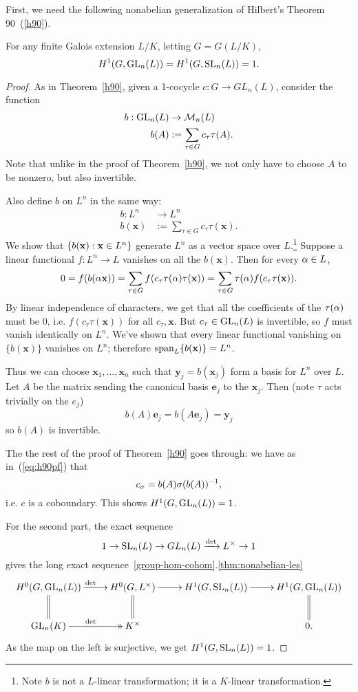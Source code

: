 First, we need the following nonabelian generalization of Hilbert's Theorem 90~(\ref{h90}).
\begin{thm}
For any finite Galois extension $L/K$, letting $G=G(L/K)$,
\[
H^1(G,\operatorname{GL}_n(L))=H^1(G,\operatorname{SL}_n(L))=1.
\]
\end{thm}
\begin{proof}
As in Theorem~\ref{h90}, given a 1-cocycle $c:G\to GL_n(L)$, consider the function
\begin{align*}
b:\operatorname{GL}_n(L)&\to \mathcal{M}_n(L)\\
b(A)&:=\sum_{\tau \in G}c_{\tau}\tau(A).
\end{align*}
Note that unlike in the proof of Theorem~\ref{h90}, we not only have to choose $A$  to be nonzero, but also invertible.

Also define $b$ on $L^n$ in the same way:
\begin{align*}
b:L^n&\to L^n\\
b(\mathbf x)&:=\sum_{\tau \in G}c_{\tau}\tau(\mathbf x).
\end{align*}
We show that $\left\{{b(\mathbf x)}:{\mathbf x\in L^n}\right\}$ generate $L^n$ as a vector space over $L$.\footnote{Note $b$ is not a $L$-linear transformation; it is a $K$-linear transformation.} Suppose a linear functional $f:L^n\to L$ vanishes on all the $b(\mathbf x)$. Then for every $\alpha\in L$,
\[
0=f(b(\alpha \mathbf x))=\sum_{\tau\in G}f(c_{\tau}\tau(\alpha)\tau(\mathbf x))
=\sum_{\tau\in G} \tau(\alpha)f(c_{\tau}\tau(\mathbf x)).
\]
By linear independence of characters, we get that all the coefficients of the $\tau(\alpha)$ must be 0, i.e. $f(c_{\tau}\tau(\mathbf x))$ for all $c_{\tau}, \mathbf x$. But $c_{\tau}\in \operatorname{GL}_n(L)$ is invertible, so $f$ must vanish identically on $L^n$. We've shown that every linear functional vanishing on $\{b(\mathbf x)\}$ vanishes on $L^n$; therefore $\operatorname{span}_L\{b(\mathbf x)\}=L^n$.

Thus we can choose $\mathbf x_1,\ldots, \mathbf x_n$ such that $\mathbf y_j=b(\mathbf x_j)$ form a basis for $L^n$ over $L$. Let $A$ be the matrix sending the canonical basis $\mathbf e_j$ to the $\mathbf x_j$. Then (note $\tau$ acts trivially on the $e_j$)
\[
b(A)\mathbf e_j=b(A\mathbf e_j)=\mathbf y_j
\]
so $b(A)$ is invertible.

The the rest of the proof of Theorem~\ref{h90} goes through: we have as in~(\ref{eq:h90pf}) that
\[
c_{\sigma}=b(A)\sigma(b(A))^{-1},
\]
i.e. $c$ is a coboundary. This shows $H^1(G,\operatorname{GL}_n(L))=1$.

For the second part, the exact sequence
\[
1\to \operatorname{SL}_n(L)\to GL_n(L)\xrightarrow{\det} L^{\times}\to 1
\]
gives the long exact sequence~\ref{group-hom-cohom}.\ref{thm:nonabelian-les}
\[
\xymatrix{
H^0(G,\GL_n(L))\ar[r]^{\det}\ar@{=}[d] & H^0(G,L^{\times}) \ar[r]\ar@{=}[d] & H^1(G,\SL_n(L))\ar[r] & H^1(G,\GL_n(L))\ar@{=}[d]\\
\GL_n(K) \ar@{->>}[r]^{\det}& K^{\times} & & 0.
}
\]
As the map on the left is surjective, we get $H^1(G,\operatorname{SL}_n(L))=1$. 
\end{proof}
